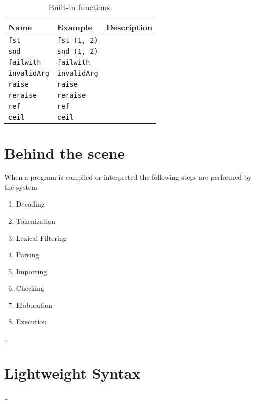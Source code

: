 \begin{table}
  \centering
  \begin{tabularx}{\linewidth}{|l|l|X|}
    \hline
    Name& Example & Description\\
    \hline
    \lstinline{fst} & \lstinline{fst (1, 2)} &\\
    \hline
    \lstinline{snd} & \lstinline{snd (1, 2)} &\\
    \hline
    \lstinline{failwith} & \lstinline{failwith} &\\
    \hline
    \lstinline{invalidArg} & \lstinline{invalidArg} &\\
    \hline
    \lstinline{raise} & \lstinline{raise} &\\
    \hline
    \lstinline{reraise} & \lstinline{reraise} &\\
    \hline
    \lstinline{ref} & \lstinline{ref} &\\
    \hline
    \hline
    \lstinline{ceil} & \lstinline{ceil} &\\
    \hline
  \end{tabularx}
  \caption{Built-in functions.}
  \label{tab:simpleBuiltInFct}
\end{table}

\section{Behind the scene}
 When a program is compiled or interpreted the following steps are performed by the system
\begin{enumerate}
\item Decoding
\item Tokenization
\item Lexical Filtering
\item Parsing
\item Importing
\item Checking
\item Elaboration
\item Execution
\end{enumerate}
\dots

\section{Lightweight Syntax}
\dots
{}

